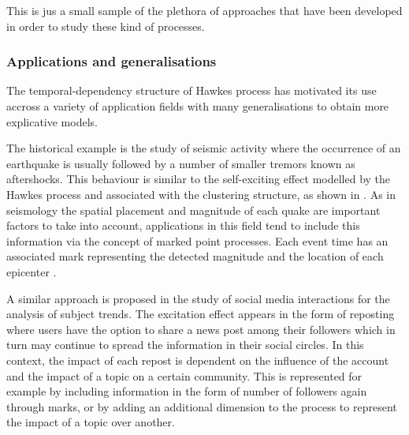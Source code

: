     This is jus a small sample of the plethora of approaches that have been developed in order to study these kind of processes.
    
    \subsubsection{Applications and generalisations}
    The temporal-dependency structure of Hawkes process has motivated its use accross a variety of application fields with many generalisations to obtain more explicative models.

    The historical example is the study of seismic activity where the occurrence of an earthquake is usually followed by a number of smaller tremors known as aftershocks.
    This behaviour is similar to the self-exciting effect modelled by the Hawkes process and associated with the clustering structure, as shown in \textcite{Adamopoulos1976}.
    As in seismology the spatial placement and magnitude of each quake are important factors to take into account, applications in this field tend to include this information via the concept of marked point processes. 
    Each event time has an associated mark representing the detected magnitude \parencite{Ogata1988} and the location of each epicenter \parencite{Ogata1998, Kwon2023}.

    A similar approach is proposed in the study of social media interactions for the analysis of subject trends.
    The excitation effect appears in the form of reposting where users have the option to share a news post among their followers which in turn may continue to spread the information in their social circles.
    In this context, the impact of each repost is dependent on the influence of the account and the impact of a topic on a certain community.
    This is represented for example by including information in the form of number of followers \parencite{Mishra2016} again through marks, or by adding an additional dimension to the process \parencite{Pinto2015} to represent the impact of a topic over another.

